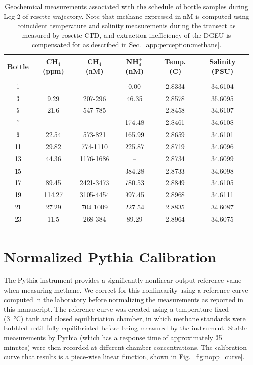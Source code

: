 \begin{table}[h!]
    \centering
    \begin{tabular}{c|c|c|c|c|c}
        Bottle & CH$_4$ (ppm) & CH$_4$ (nM) & NH$_4^+$ (nM) & Temp. (C) & Salinity (PSU) \\
        \hline
        \hline
        &&&&&\\
        1 & -- & -- & 0.00 & 2.8334 & 34.6104 \\
        3 & 9.29 & 207-296 & 46.35 & 2.8578 & 35.6095 \\ 
        5 & 21.6 & 547-785 & -- & 2.8458 & 34.6107 \\
        7 & -- & -- & 174.48 & 2.8461 & 34.6108 \\
        9 & 22.54 & 573-821 & 165.99 & 2.8659 & 34.6101 \\
        11 & 29.82 & 774-1110 & 225.87 & 2.8719 & 34.6096 \\
        13 & 44.36 & 1176-1686 & -- & 2.8734 & 34.6099 \\
        15 & -- & -- & 384.28 & 2.8733 & 34.6098 \\
        17 & 89.45 & 2421-3473 & 780.53 & 2.8849 & 34.6105 \\
        19 & 114.27 & 3105-4454 & 997.45 & 2.8968 & 34.6111 \\
        21 & 27.29 & 704-1009 & 227.54 & 2.8835 & 34.6087 \\
        23 & 11.5 & 268-384 & 89.29 & 2.8964 & 34.6075 \\
        &&&&&
    \end{tabular}
    \caption{Geochemical measurements associated with the schedule of bottle samples during Leg 2 of rosette trajectory. Note that methane expressed in nM is computed using coincident temperature and salinity measurements during the transect as measured by rosette CTD, and extraction inefficiency of the DGEU is compensated for as described in Sec.~\ref{app:perception:methane}.}
    \label{tab:niskin_sched_results}
\end{table}


\section{Normalized Pythia Calibration}
\label{app:perception:norm}
The Pythia instrument provides a significantly nonlinear output reference value when measuring methane. We correct for this nonlinearity using a reference curve computed in the laboratory before normalizing the measurements as reported in this manuscript. The reference curve was created using a temperature-fixed (\SI{3}{\celsius}) tank and closed equilibriation chamber, in which methane standards were bubbled until fully equilibriated before being measured by the instrument. Stable measurements by Pythia (which has a response time of approximately 35 minutes) were then recorded at different chamber concentrations. The calibration curve that results is a piece-wise linear function, shown in Fig.~\ref{fig:nopp_curve}.

